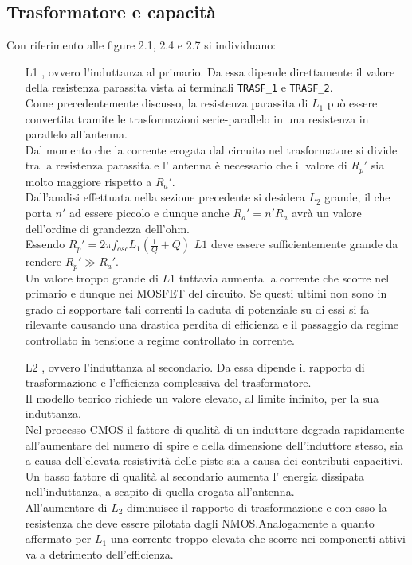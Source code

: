 \documentclass[a4paper, 12pt]{memoir}
\begin{document}
\subsection{Trasformatore e capacità}
Con riferimento alle figure 2.1, 2.4 e 2.7 si individuano:
\begin{enumerate}
\item[L1], ovvero l'induttanza al primario. Da essa dipende direttamente il
	valore della resistenza parassita vista ai terminali \texttt{TRASF\_1} e
	\texttt{TRASF\_2}.\\
	Come precedentemente discusso, la resistenza parassita di $L_1$ può essere
	convertita tramite le trasformazioni serie-parallelo in una resistenza
	in parallelo all'antenna.\\
	Dal momento che la corrente erogata dal circuito nel trasformatore si
	divide tra la resistenza parassita e l' antenna è necessario che il
	valore di $R_p'$ sia molto maggiore rispetto a $R_a'$.\\
	Dall'analisi effettuata nella sezione precedente si desidera $L_2$ grande,
	il che porta $n'$ ad essere piccolo e dunque anche $R_a' = n'R_a$ avrà un
	valore dell'ordine di grandezza dell'ohm.\\
	Essendo $R_p' = 2\pi f_{osc} L_1 \left(\frac{1}{Q} + Q \right)$ $L1$ deve
	essere sufficientemente grande da rendere $R_p' \gg R_a'$.\\
	Un valore troppo grande di $L1$ tuttavia aumenta la corrente che scorre
	nel primario e dunque nei MOSFET del circuito. Se questi ultimi non sono
	in grado di sopportare tali correnti la caduta di potenziale su di essi
	si fa rilevante causando una drastica perdita di efficienza e il
	passaggio da regime controllato in tensione a regime controllato in
	corrente.

\item[L2], ovvero l'induttanza al secondario. Da essa dipende il rapporto di
	trasformazione e l'efficienza complessiva del trasformatore.\\
	Il modello teorico richiede un valore elevato, al limite infinito, per la
	sua induttanza.\\
	Nel processo CMOS il fattore di qualità di un induttore degrada
	rapidamente all'aumentare del numero di spire e della dimensione
	dell'induttore stesso, sia a causa dell'elevata resistività delle piste
	sia a causa dei contributi capacitivi\cite{RazaviRF}.\\
	Un basso fattore di qualità al secondario aumenta l' energia dissipata
	nell'induttanza, a scapito di quella erogata all'antenna.\\
	All'aumentare di $L_2$ diminuisce il rapporto di trasformazione e con
	esso la resistenza che deve essere pilotata dagli NMOS.\@ Analogamente a
	quanto affermato per $L_1$ una corrente troppo elevata che scorre nei
	componenti attivi va a detrimento dell'efficienza.


\end{enumerate}
\end{document}
